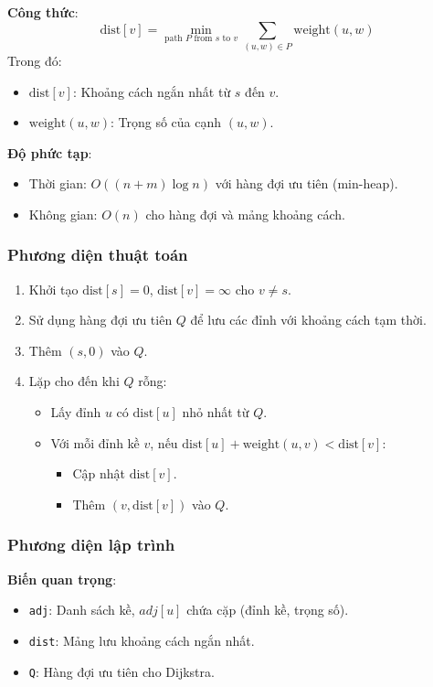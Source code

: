 \documentclass[a4paper,12pt]{article}
\begin{document}
\textbf{Công thức}:
\[
\text{dist}[v] = \min_{\text{path } P \text{ from } s \text{ to } v} \sum_{(u,w) \in P} \text{weight}(u,w)
\]
Trong đó:
\begin{itemize}
    \item \( \text{dist}[v] \): Khoảng cách ngắn nhất từ \( s \) đến \( v \).
    \item \( \text{weight}(u,w) \): Trọng số của cạnh \( (u,w) \).
\end{itemize}

\textbf{Độ phức tạp}:
\begin{itemize}
    \item Thời gian: \( O((n + m) \log n) \) với hàng đợi ưu tiên (min-heap).
    \item Không gian: \( O(n) \) cho hàng đợi và mảng khoảng cách.
\end{itemize}

\subsubsection{Phương diện thuật toán}
\begin{enumerate}
    \item Khởi tạo \( \text{dist}[s] = 0 \), \( \text{dist}[v] = \infty \) cho \( v \neq s \).
    \item Sử dụng hàng đợi ưu tiên \( Q \) để lưu các đỉnh với khoảng cách tạm thời.
    \item Thêm \( (s, 0) \) vào \( Q \).
    \item Lặp cho đến khi \( Q \) rỗng:
        \begin{itemize}
            \item Lấy đỉnh \( u \) có \( \text{dist}[u] \) nhỏ nhất từ \( Q \).
            \item Với mỗi đỉnh kề \( v \), nếu \( \text{dist}[u] + \text{weight}(u,v) < \text{dist}[v] \):
                \begin{itemize}
                    \item Cập nhật \( \text{dist}[v] \).
                    \item Thêm \( (v, \text{dist}[v]) \) vào \( Q \).
                \end{itemize}
        \end{itemize}
\end{enumerate}

\subsubsection{Phương diện lập trình}
\textbf{Biến quan trọng}:
\begin{itemize}
    \item \texttt{adj}: Danh sách kề, \( adj[u] \) chứa cặp (đỉnh kề, trọng số).
    \item \texttt{dist}: Mảng lưu khoảng cách ngắn nhất.
    \item \texttt{Q}: Hàng đợi ưu tiên cho Dijkstra.
\end{itemize}
\end{document}
